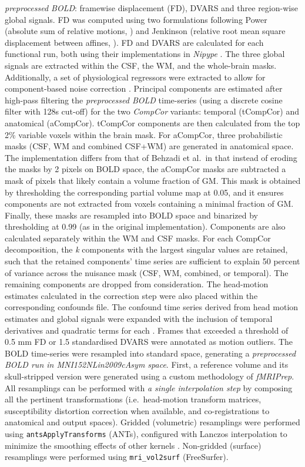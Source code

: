 \documentclass[
]{article}
\begin{document}
\begin{description}
\emph{preprocessed BOLD}: framewise displacement (FD), DVARS and three
region-wise global signals. FD was computed using two formulations
following Power (absolute sum of relative motions,
\citet{power_fd_dvars}) and Jenkinson (relative root mean square
displacement between affines, \citet{mcflirt}). FD and DVARS are
calculated for each functional run, both using their implementations in
\emph{Nipype} \citep[following the definitions by][]{power_fd_dvars}.
The three global signals are extracted within the CSF, the WM, and the
whole-brain masks. Additionally, a set of physiological regressors were
extracted to allow for component-based noise correction
\citep[\emph{CompCor},][]{compcor}. Principal components are estimated
after high-pass filtering the \emph{preprocessed BOLD} time-series
(using a discrete cosine filter with 128s cut-off) for the two
\emph{CompCor} variants: temporal (tCompCor) and anatomical (aCompCor).
tCompCor components are then calculated from the top 2\% variable voxels
within the brain mask. For aCompCor, three probabilistic masks (CSF, WM
and combined CSF+WM) are generated in anatomical space. The
implementation differs from that of Behzadi et al.~in that instead of
eroding the masks by 2 pixels on BOLD space, the aCompCor masks are
subtracted a mask of pixels that likely contain a volume fraction of GM.
This mask is obtained by thresholding the corresponding partial volume
map at 0.05, and it ensures components are not extracted from voxels
containing a minimal fraction of GM. Finally, these masks are resampled
into BOLD space and binarized by thresholding at 0.99 (as in the
original implementation). Components are also calculated separately
within the WM and CSF masks. For each CompCor decomposition, the
\emph{k} components with the largest singular values are retained, such
that the retained components' time series are sufficient to explain 50
percent of variance across the nuisance mask (CSF, WM, combined, or
temporal). The remaining components are dropped from consideration. The
head-motion estimates calculated in the correction step were also placed
within the corresponding confounds file. The confound time series
derived from head motion estimates and global signals were expanded with
the inclusion of temporal derivatives and quadratic terms for each
\citep{confounds_satterthwaite_2013}. Frames that exceeded a threshold
of 0.5 mm FD or 1.5 standardised DVARS were annotated as motion
outliers. The BOLD time-series were resampled into standard space,
generating a \emph{preprocessed BOLD run in MNI152NLin2009cAsym space}.
First, a reference volume and its skull-stripped version were generated
using a custom methodology of \emph{fMRIPrep}. All resamplings can be
performed with \emph{a single interpolation step} by composing all the
pertinent transformations (i.e.~head-motion transform matrices,
susceptibility distortion correction when available, and
co-registrations to anatomical and output spaces). Gridded (volumetric)
resamplings were performed using \texttt{antsApplyTransforms} (ANTs),
configured with Lanczos interpolation to minimize the smoothing effects
of other kernels \citep{lanczos}. Non-gridded (surface) resamplings were
performed using \texttt{mri\_vol2surf} (FreeSurfer).
\end{description}
\end{document}
